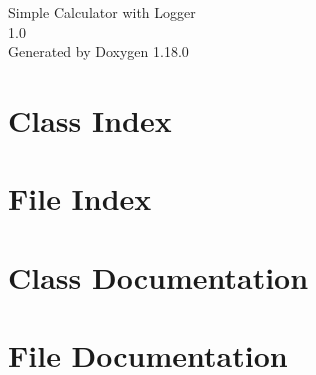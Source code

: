 \documentclass[twoside]{book}
\newcommand{\+}{\discretionary{\mbox{\scriptsize$\hookleftarrow$}}{}{}}
\newcommand{\clearemptydoublepage}{%
    \newpage{\pagestyle{empty}\cleardoublepage}%
  }
\begin{document}
  \raggedbottom
  \begin{titlepage}
  \vspace*{7cm}
  \begin{center}%
  {\Large Simple Calculator with Logger}\\
  [1ex]\large 1.\+0 \\
  \vspace*{1cm}
  {\large Generated by Doxygen 1.18.0}\\
  \end{center}
  \end{titlepage}
  \clearemptydoublepage
  \tableofcontents
  \clearemptydoublepage


\chapter{Class Index}

\chapter{File Index}

\chapter{Class Documentation}


\chapter{File Documentation}







  \backmatter
  \newpage
  \clearemptydoublepage
  \printindex
\end{document}
